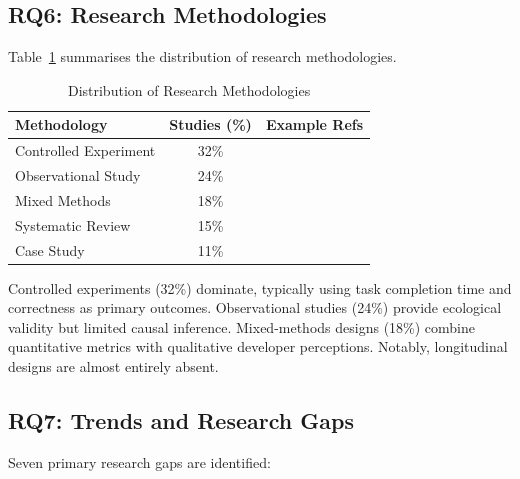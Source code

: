 \documentclass[journal,twoside,10pt]{IEEEtran}
\begin{document}
\subsection{RQ6: Research Methodologies}

Table~\ref{tab:methods} summarises the distribution of research methodologies.

\begin{table}[!t]
  \caption{Distribution of Research Methodologies}
  \label{tab:methods}
  \centering
  \renewcommand{\arraystretch}{1.2}
  \begin{tabular}{lcc}
    \toprule
    \textbf{Methodology} & \textbf{Studies (\%)} & \textbf{Example Refs} \\
    \midrule
    Controlled Experiment  & 32\% & \cite{shihab2025brownfield,liu2023chatgpt,imai2022copilot} \\
    Observational Study    & 24\% & \cite{pandey2024copilot,song2024opensource,ng2024publicsector} \\
    Mixed Methods          & 18\% & \cite{seker2024modular,bakal2025zoominfo,weisz2024enterprise} \\
    Systematic Review      & 15\% & \cite{adepoju2023copilot,swaraj2025llm,mohamed2025slr} \\
    Case Study             & 11\% & \cite{gokalp2025pair,waseem2023novice} \\
    \bottomrule
  \end{tabular}
\end{table}

Controlled experiments (32\%) dominate, typically using task completion time
and correctness as primary outcomes. Observational studies (24\%) provide
ecological validity but limited causal inference. Mixed-methods designs (18\%)
combine quantitative metrics with qualitative developer perceptions. Notably,
longitudinal designs are almost entirely absent.

\subsection{RQ7: Trends and Research Gaps}

Seven primary research gaps are identified:
\end{document}
